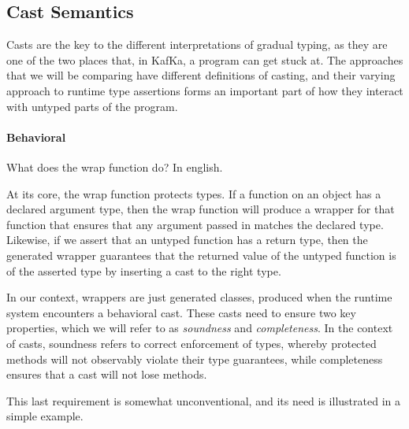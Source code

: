 \documentclass[a4paper,USenglish]{tex/lipics-v2016}
\begin{document}
\subsection{Cast Semantics}

Casts are the key to the different interpretations of gradual typing, as they are one of the two places that, in KafKa, a program can get stuck at. The approaches that we will be comparing have different definitions of casting, and their varying approach to runtime type assertions forms an important part of how they interact with untyped parts of the program.


\paragraph{Behavioral}



\hrulefill

\begin{mathpar}
\end{mathpar}

What does the wrap function do? In english.

At its core, the wrap function protects types. If a function on an object has a declared argument type, then the wrap function will produce a wrapper for that function that ensures that any argument passed in matches the declared type. Likewise, if we assert that an untyped function has a return type, then the generated wrapper guarantees that the returned value of the untyped function is of the asserted type by inserting a cast to the right type.

In our context, wrappers are just generated classes, produced when the runtime system encounters a behavioral cast. These casts need to ensure two key properties, which we will refer to as \emph{soundness} and \emph{completeness}. In the context of casts, soundness refers to correct enforcement of types, whereby protected methods will not observably violate their type guarantees, while completeness ensures that a cast will not lose methods.

This last requirement is somewhat unconventional, and its need is illustrated in a simple example. 
\end{document}
